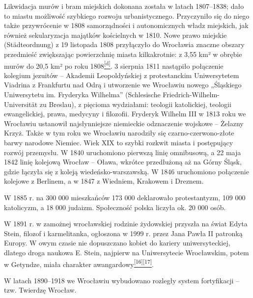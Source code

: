 \documentclass{article}
\begin{document}
Likwidacja murów i bram miejskich dokonana została w latach 1807–1838; dało to miastu możliwość szybkiego rozwoju urbanistycznego. Przyczyniło się do niego także przywrócenie w 1808 samorządności i autonomicznych władz miejskich, jak również sekularyzacja majątków kościelnych w 1810. Nowe prawo miejskie (Städteordnung) z 19 listopada 1808 przyłączyło do Wrocławia znaczne obszary przedmieść zwiększając powierzchnię miasta kilkakrotnie: z 3,55 km² w obrębie murów do 20,5 km² po roku 1808\hyperlink{d}{\textsuperscript{[d]}}. 3 sierpnia 1811 nastąpiło połączenie kolegium jezuitów – Akademii Leopoldyńskiej z protestanckim Uniwersytetem Viadrina z Frankfurtu nad Odrą i utworzenie we Wrocławiu nowego „Śląskiego Uniwersytetu im. Fryderyka Wilhelma” (Schlesische Friedrich-Wilhelm-Universität zu Breslau), z pięcioma wydziałami: teologii katolickiej, teologii ewangelickiej, prawa, medycyny i filozofii. Fryderyk Wilhelm III w 1813 roku we Wrocławiu ustanowił najsłynniejsze niemieckie odznaczenie wojskowe – Żelazny Krzyż. Także w tym roku we Wrocławiu narodziły się czarno-czerwono-złote barwy narodowe Niemiec. Wiek XIX to szybki rozkwit miasta i postępujący rozwój przemysłu. W 1840 uruchomiono pierwszą linię omnibusową, a 22 maja 1842 linię kolejową Wrocław – Oława, wkrótce przedłużoną aż na Górny Śląsk, gdzie łączyła się z koleją wiedeńsko-warszawską. W 1846 uruchomiono połączenie kolejowe z Berlinem, a w 1847 z Wiedniem, Krakowem i Dreznem.

W 1885 r. na 300 000 mieszkańców 173 000 deklarowało protestantyzm, 109 000 katolicyzm, a 18 000 judaizm. Społeczność polska liczyła ok. 20 000 osób.

W 1891 r. w zamożnej wrocławskiej rodzinie żydowskiej przyszła na świat Edyta Stein, filozof i karmelitanka, ogłoszona w 1999 r. przez Jana Pawła II patronką Europy. W owym czasie nie dopuszczano kobiet do kariery uniwersyteckiej, dlatego droga naukowa E. Stein, najpierw na Uniwersytecie Wrocławskim, potem w Getyndze, miała charakter awangardowy\hyperlink{16}{\textsuperscript{[16]}}\hyperlink{17}{\textsuperscript{[17]}}.

W latach 1890–1918 we Wrocławiu wybudowano rozległy system fortyfikacji – tzw. Twierdzę Wrocław.
\end{document}
